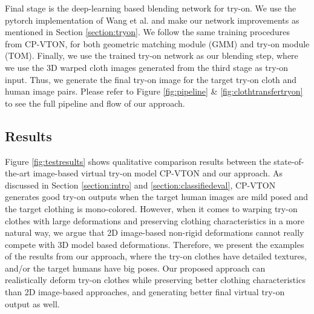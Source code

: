 Final stage is the deep-learning based blending network for try-on. We use the pytorch implementation of Wang et al.\cite{Wang2018TowardCI} and make our network improvements as mentioned in Section \ref{section:tryon}. We follow the same training procedures from CP-VTON\cite{Wang2018TowardCI}, for both geometric matching module (GMM) and try-on module (TOM). Finally, we use the trained try-on network as our blending step, where we use the 3D warped cloth images generated from the third stage as try-on input. Thus, we generate the final try-on image for the target try-on cloth and human image pairs. Please refer to Figure \ref{fig:pipeline} \& \ref{fig:clothtransfertryon} to see the full pipeline and flow of our approach.



\subsection{Results}


Figure \ref{fig:testresults} shows qualitative comparison results between the state-of-the-art image-based virtual try-on model CP-VTON\cite{Wang2018TowardCI} and our approach. As discussed in Section \ref{section:intro} and  \ref{section:classifiedeval}, CP-VTON\cite{Wang2018TowardCI} generates good try-on outputs when the target human images are mild posed and the target clothing is mono-colored. However, when it comes to warping try-on clothes with large deformations and preserving clothing characteristics in a more natural way, we argue that 2D image-based non-rigid deformations cannot really compete with 3D model based deformations. Therefore, we present the examples of the results from our approach, where the try-on clothes have detailed textures, and/or the target humans have big poses. Our proposed approach can realistically deform try-on clothes while preserving better clothing characteristics than 2D image-based approaches, and generating better final virtual try-on output as well.



